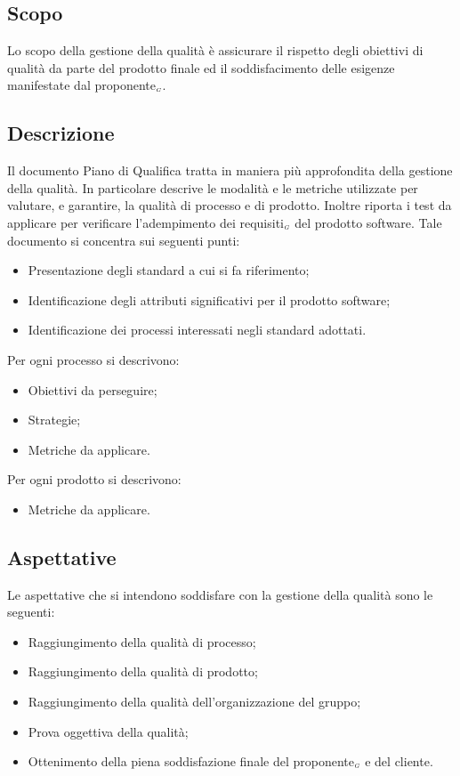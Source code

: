 \subsection{Scopo} \label{ProcessiDiSupportoGestioneDellaQualitàScopo}
Lo scopo della gestione della qualità è assicurare il rispetto degli obiettivi di qualità da parte del prodotto finale ed il soddisfacimento delle esigenze manifestate dal proponente$_{\scaleto{G}{3pt}}$.
\subsection{Descrizione} \label{ProcessiDiSupportoGestioneDellaQualitàDescrizione}
Il documento Piano di Qualifica tratta in maniera più approfondita della gestione della qualità. In particolare descrive le modalità e le metriche utilizzate per valutare, e garantire, la qualità di processo e di prodotto. Inoltre riporta i test da applicare per verificare l’adempimento dei requisiti$_{\scaleto{G}{3pt}}$ del prodotto software. Tale documento si concentra sui seguenti punti:
\begin{itemize}
	\item Presentazione degli standard a cui si fa riferimento;
	\item Identificazione degli attributi significativi per il prodotto software;
	\item Identificazione dei processi interessati negli standard adottati.
\end{itemize}
Per ogni processo si descrivono:
\begin{itemize}
	\item Obiettivi da perseguire;
	\item Strategie;
	\item Metriche da applicare.
\end{itemize}
Per ogni prodotto si descrivono:
\begin{itemize}
	\item Metriche da applicare.
\end{itemize}
\subsection{Aspettative} \label{ProcessiDiSupportoGestioneDellaQualitàAspettative}
Le aspettative che si intendono soddisfare con la gestione della qualità sono le seguenti:
\begin{itemize}
	\item Raggiungimento della qualità di processo;
	\item Raggiungimento della qualità di prodotto;
	\item Raggiungimento della qualità dell’organizzazione del gruppo;
	\item Prova oggettiva della qualità;
	\item Ottenimento della piena soddisfazione finale del proponente$_{\scaleto{G}{3pt}}$ e del cliente.
\end{itemize}
